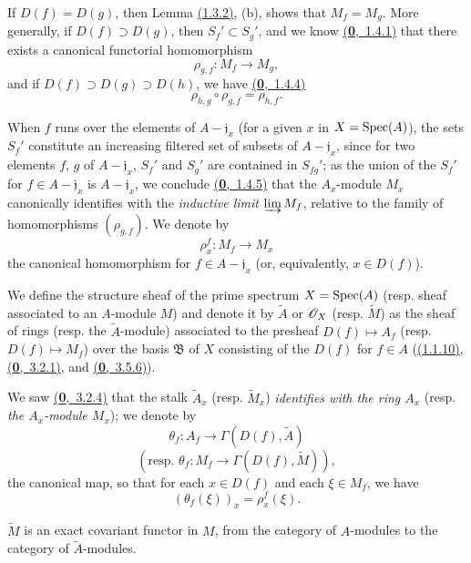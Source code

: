 \begin{env}[1.3.3]
\label{env-1.1.3.3}
If $D(f)=D(g)$, then Lemma \hyperref[lem-1.1.3.2]{(1.3.2)}, (b), shows that $M_f=M_g$. More generally, if
$D(f)\supset D(g)$, then $S_f'\subset S_g'$, and we know \hyperref[env-0.1.4.1]{(\textbf{0},~1.4.1)} that there exists
a canonical functorial homomorphism
\[
  \rho_{g,f}:M_f\longrightarrow M_g,
\]
and if $D(f)\supset D(g)\supset D(h)$, we have \hyperref[env-0.1.4.4]{(\textbf{0},~1.4.4)}
\[
  \rho_{h,g}\circ\rho_{g,f}=\rho_{h,f}.
  \tag{1.3.3.1}
\]
\end{env}

When $f$ runs over the elements of $A-\mathfrak{j}_x$ (for a given $x$ in $X={\mathop{\mathrm{Spec}}\nolimits}(A)$), the
sets $S_f'$ constitute an increasing filtered set of subsets of $A-\mathfrak{j}_x$, since for
two elements $f$, $g$ of $A-\mathfrak{j}_x$, $S_f'$ and $S_g'$ are contained in $S_{fg}'$; as
the union of the $S_f'$ for $f\in A-\mathfrak{j}_x$ is $A-\mathfrak{j}_x$, we conclude
\hyperref[env-0.1.4.5]{(\textbf{0},~1.4.5)} that the $A_x$-module $M_x$ canonically identifies with the {\em inductive
limit} $\varinjlim M_f$, relative to the family of homomorphisms $(\rho_{g,f})$. We denote by
\[
  \rho_x^f:M_f\longrightarrow M_x
\]
the canonical homomorphism for $f\in A-\mathfrak{j}_x$ (or, equivalently, $x\in D(f)$).

\begin{defn}[1.3.4]
\label{defn-1.1.3.4}
We define the structure sheaf of the prime spectrum $X={\mathop{\mathrm{Spec}}\nolimits}(A)$ (resp. sheaf associated to
an $A$-module $M$) and denote it by $\widetilde{A}$ or $\mathscr{O}_X$ (resp. $\widetilde{M}$) as the
sheaf of rings (resp. the $\widetilde{A}$-module) associated to the presheaf
$D(f)\mapsto A_f$ (resp. $D(f)\mapsto M_f$) over the basis $\mathfrak{B}$ of $X$ consisting
of the $D(f)$ for $f\in A$ (\hyperref[prop-1.1.1.10]{(1.1.10)}, \hyperref[env-0.3.2.1]{(\textbf{0},~3.2.1)}, and
\hyperref[env-0.3.5.6]{(\textbf{0},~3.5.6)}).
\end{defn}

We saw \hyperref[env-0.3.2.4]{(\textbf{0},~3.2.4)} that the stalk $\widetilde{A}_x$ (resp. $\widetilde{M}_x$)
{\em identifies with the ring $A_x$} (resp. {\em the $A_x$-module $M_x$}); we denote by
\[
  \theta_f:A_f\longrightarrow\Gamma(D(f),\widetilde{A})
\]
\[
  (\text{resp. }\theta_f:M_f\longrightarrow\Gamma(D(f),\widetilde{M})),
\]
the canonical map, so that for each $x\in D(f)$ and each $\xi\in M_f$, we have
\[
  (\theta_f(\xi))_x=\rho_x^f(\xi).
  \tag{1.3.4.1}
\]

\begin{prop}[1.3.5]
\label{prop-1.1.3.5}
$\widetilde{M}$ is an exact covariant functor in $M$, from the category of $A$-modules to the
category of $\widetilde{A}$-modules.
\end{prop}

